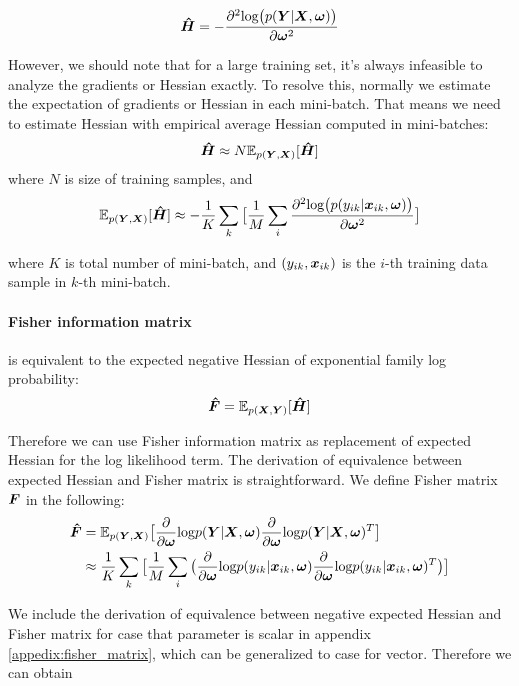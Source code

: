 \[
\boldsymbol{\hat{H}} = -\frac{\partial^2\text{log}\big(p(\boldsymbol Y|\boldsymbol X, \boldsymbol \omega)\big)}{\partial \boldsymbol \omega^2}
\] 

However, we should note that for a large training set, it's always infeasible to analyze the gradients or Hessian exactly. To resolve this, normally we estimate the expectation of gradients or Hessian in each mini-batch. That means we need to estimate Hessian with empirical average Hessian computed in mini-batches:
\[
\boldsymbol{\hat H} \approx N\mathbb E_{p(\boldsymbol Y, \boldsymbol X)}[\boldsymbol{\hat{H}}]
\]
where $N$ is size of training samples, and 
\begin{equation} \label{expected hessian}
\mathbb E_{p(\boldsymbol Y, \boldsymbol X)}[\boldsymbol{\hat{H}}] \approx -\frac{1}{K}\sum_{k}\big[\frac{1}{M}\sum_{i}\frac{\partial^2\text{log}\big(p(y_{ik}|\boldsymbol x_{ik}, \boldsymbol \omega)\big)}{\partial \boldsymbol \omega^2}\big]
\end{equation}

where $K$ is total number of mini-batch, and $(y_{ik}, \boldsymbol x_{ik})$ is the $i$-th training data sample in $k$-th mini-batch. 

\paragraph{Fisher information matrix} is equivalent to the expected negative Hessian of exponential family log probability:
\[
\boldsymbol{\hat{F}} = \mathbb E_{p(\boldsymbol X, \boldsymbol Y)}[\boldsymbol{\hat{H}}]
\]

Therefore we can use Fisher information matrix as replacement of expected Hessian for the log likelihood term. The derivation of equivalence between expected Hessian and Fisher matrix is straightforward. We define Fisher matrix $\boldsymbol F$ in the following:
\begin{equation}
\begin{aligned}\label{Fisher}
\boldsymbol{\hat{F}} &= \mathbb E_{p(\boldsymbol Y, \boldsymbol X)}\big[\frac{\partial}{\partial \boldsymbol \omega}\text{log}p(\boldsymbol Y|\boldsymbol X,\boldsymbol \omega)\frac{\partial}{\partial \boldsymbol \omega}\text{log}p(\boldsymbol Y|\boldsymbol X,\boldsymbol \omega)^T\big] \\
&\approx \frac{1}{K}\sum_{k}\big[\frac{1}{M}\sum_{i}
\big(\frac{\partial}{\partial \boldsymbol \omega}\text{log}p(y_{ik}|\boldsymbol x_{ik},\boldsymbol \omega)\frac{\partial}{\partial \boldsymbol \omega}\text{log}p(y_{ik}|\boldsymbol x_{ik},\boldsymbol \omega)^T\big)\big]
\end{aligned}
\end{equation}

We include the derivation of equivalence between negative expected Hessian and Fisher matrix for case that parameter is scalar in appendix \ref{appedix:fisher_matrix}, which can be generalized to case for vector.
Therefore we can obtain 


